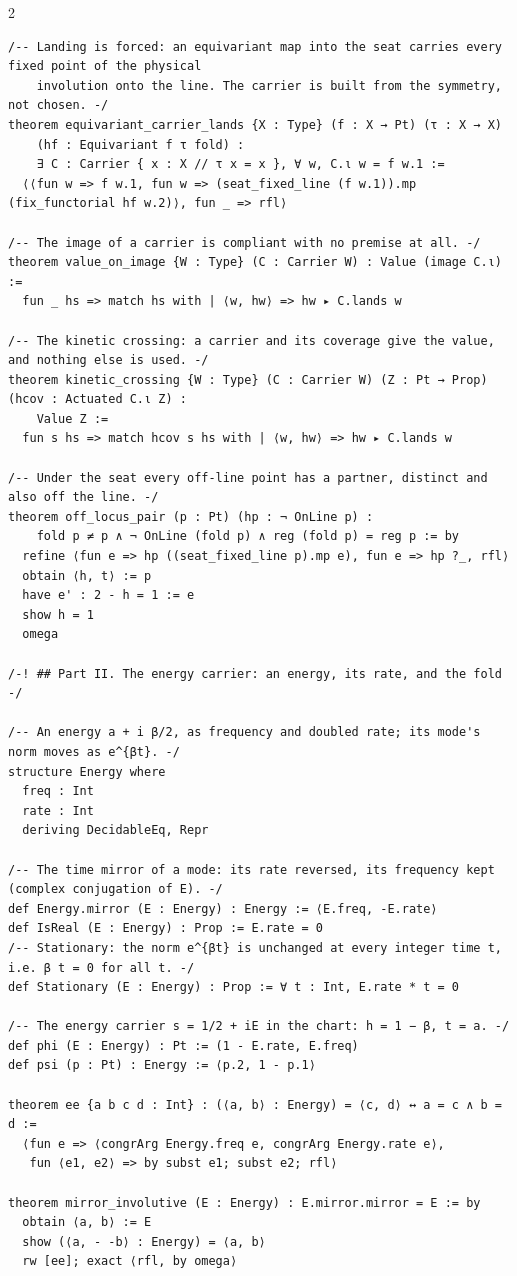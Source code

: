 \documentclass[10pt]{article}
\begin{document}
\begin{multicols}{2}
\begin{Verbatim}[fontsize=\fontsize{6.0}{6.9}\selectfont,breaklines,breakanywhere,breaksymbolleft={}]
/-- Landing is forced: an equivariant map into the seat carries every fixed point of the physical
    involution onto the line. The carrier is built from the symmetry, not chosen. -/
theorem equivariant_carrier_lands {X : Type} (f : X → Pt) (τ : X → X)
    (hf : Equivariant f τ fold) :
    ∃ C : Carrier { x : X // τ x = x }, ∀ w, C.ι w = f w.1 :=
  ⟨⟨fun w => f w.1, fun w => (seat_fixed_line (f w.1)).mp (fix_functorial hf w.2)⟩, fun _ => rfl⟩

/-- The image of a carrier is compliant with no premise at all. -/
theorem value_on_image {W : Type} (C : Carrier W) : Value (image C.ι) :=
  fun _ hs => match hs with | ⟨w, hw⟩ => hw ▸ C.lands w

/-- The kinetic crossing: a carrier and its coverage give the value, and nothing else is used. -/
theorem kinetic_crossing {W : Type} (C : Carrier W) (Z : Pt → Prop) (hcov : Actuated C.ι Z) :
    Value Z :=
  fun s hs => match hcov s hs with | ⟨w, hw⟩ => hw ▸ C.lands w

/-- Under the seat every off-line point has a partner, distinct and also off the line. -/
theorem off_locus_pair (p : Pt) (hp : ¬ OnLine p) :
    fold p ≠ p ∧ ¬ OnLine (fold p) ∧ reg (fold p) = reg p := by
  refine ⟨fun e => hp ((seat_fixed_line p).mp e), fun e => hp ?_, rfl⟩
  obtain ⟨h, t⟩ := p
  have e' : 2 - h = 1 := e
  show h = 1
  omega

/-! ## Part II. The energy carrier: an energy, its rate, and the fold -/

/-- An energy a + i β/2, as frequency and doubled rate; its mode's norm moves as e^{βt}. -/
structure Energy where
  freq : Int
  rate : Int
  deriving DecidableEq, Repr

/-- The time mirror of a mode: its rate reversed, its frequency kept (complex conjugation of E). -/
def Energy.mirror (E : Energy) : Energy := ⟨E.freq, -E.rate⟩
def IsReal (E : Energy) : Prop := E.rate = 0
/-- Stationary: the norm e^{βt} is unchanged at every integer time t, i.e. β t = 0 for all t. -/
def Stationary (E : Energy) : Prop := ∀ t : Int, E.rate * t = 0

/-- The energy carrier s = 1/2 + iE in the chart: h = 1 − β, t = a. -/
def phi (E : Energy) : Pt := (1 - E.rate, E.freq)
def psi (p : Pt) : Energy := ⟨p.2, 1 - p.1⟩

theorem ee {a b c d : Int} : (⟨a, b⟩ : Energy) = ⟨c, d⟩ ↔ a = c ∧ b = d :=
  ⟨fun e => ⟨congrArg Energy.freq e, congrArg Energy.rate e⟩,
   fun ⟨e1, e2⟩ => by subst e1; subst e2; rfl⟩

theorem mirror_involutive (E : Energy) : E.mirror.mirror = E := by
  obtain ⟨a, b⟩ := E
  show (⟨a, - -b⟩ : Energy) = ⟨a, b⟩
  rw [ee]; exact ⟨rfl, by omega⟩


\end{Verbatim}
\end{multicols}
\end{document}
